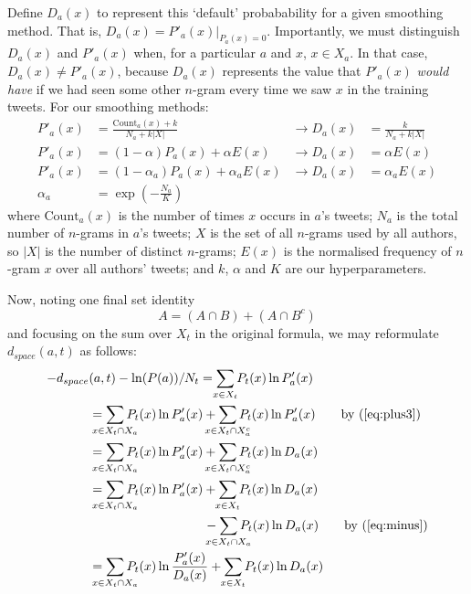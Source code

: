 \documentclass[twocolumn,10pt]{article}
\begin{document}
Define $D_a(x)$ to represent this `default' probabability for a given
smoothing method. That is, $D_a(x) = P'_a(x) |_{P_a(x)=0}$.
Importantly, we must distinguish $D_a(x)$ and $P'_a(x)$ when, for a
particular $a$ and $x$, $x \in X_a$. In that case, $D_a(x) \neq P'_a(x)$,
because $D_a(x)$ represents the value that $P'_a(x)$ \emph{would have}
if we had seen some other $n$-gram every time we saw $x$ in the training
tweets.
For our smoothing methods:
\begin{align*}
P'_a(x)
    &= \frac{\text{Count}_a(x) + k}
            {N_a + k|X|}
&
\rightarrow
D_a(x)
    &= \frac{k}
            {N_a + k|X|}
\tag{additive smoothing}
\\
P'_a(x)
    &= (1-\alpha) P_a(x) + \alpha E(x) 
&
\rightarrow
D_a(x)
    &= \alpha E(x)
\tag{interpolation smoothing}
\\
P'_a(x)
    &= (1-\alpha_a)P_a(x)
        + \alpha_a E(x)
&
\rightarrow
D_a(x)
    &= \alpha_a E(x)
\\
\alpha_a
    &= \exp\left(-\tfrac{N_a}{K}\right)
\tag{decaying interpolation smoothing}
\end{align*}
where
$\text{Count}_a(x)$ is the number of times $x$ occurs in $a$'s tweets;
$N_a$ is the total number of $n$-grams in $a$'s tweets;
$X$ is the set of all $n$-grams used by all authors, so $|X|$ is the
    number of distinct $n$-grams;
$E(x)$ is the normalised frequency of $n$-gram $x$ over all authors'
    tweets;
and
$k$, $\alpha$ and $K$ are our hyperparameters.

Now, noting one final set identity
\begin{equation}
\label{eq:plus3}
A = (A \cap B) + (A \cap B^c)
\end{equation}
and focusing on the sum over $X_t$ in the original formula,
we may reformulate $d_{space}(a, t)$ as follows:
\begingroup
\allowdisplaybreaks
\begin{align*}
-d_{space}&(a, t)
        - \ln (P(a)) / N_t
        = \smashoperator{\sum_{x \in X_t}} P_t(x) \ln P'_a(x)
\\
&=
    \smashoperator{\sum_{x \in X_t \cap X_a}} P_t(x) \ln P'_a(x)
    +
    \smashoperator{\sum_{x \in X_t \cap X_a^c}} P_t(x) \ln P'_a(x)
\tag*{by (\ref{eq:plus3})}
\\
&=
    \smashoperator{\sum_{x \in X_t \cap X_a}} P_t(x) \ln P'_a(x)
    +
    \smashoperator{\sum_{x \in X_t \cap X_a^c}} P_t(x) \ln D_a(x)
\\
&=
    \smashoperator{\sum_{x \in X_t \cap X_a}} P_t(x) \ln P'_a(x)
    +
    \smashoperator{\sum_{x \in X_t}} P_t(x) \ln D_a(x)
\\
&\hspace{9em}
    -
    \smashoperator{\sum_{x \in X_t \cap X_a}}   P_t(x) \ln D_a(x)
\tag*{by (\ref{eq:minus})}
\\
&=
    \smashoperator{\sum_{x \in X_t \cap X_a}}
        P_t(x) \ln \frac{P'_a(x)}{D_a(x)}
    +
    \smashoperator{\sum_{x \in X_t}} P_t(x) \ln D_a(x)
\end{align*}
\endgroup
\end{document}
